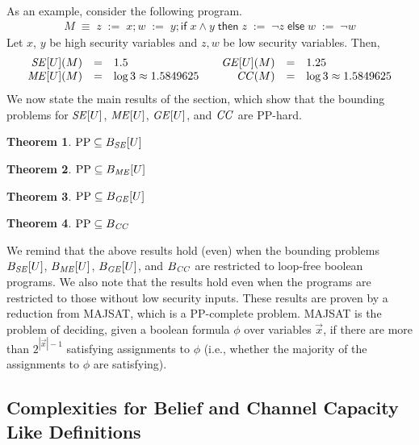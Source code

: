 \documentclass{llncs}
\newtheorem{theorem}{Theorem}[section]
\newcommand{\ttif}[3]{\textsf{if}\;{#1}\;\textsf{then}\;{#2}\;\textsf{else}\;{#3}}
\newcommand{\ttassign}[2]{{#1}\;:=\;{#2}}
\newcommand{\vect}[1]{\overrightarrow{{#1}}}
\begin{document}
As an example, consider the following program.
\[
\begin{array}{c}
M \;\equiv\; \ttassign{z}{x};\ttassign{w}{y};\ttif{x \wedge y}{\ttassign{z}{\neg z}}{\ttassign{w}{\neg w}}
\end{array}
\]
Let $x$, $y$ be high security variables and $z, w$ be low security
variables.  Then,
\[
\begin{array}{rcll}
{\it SE}[U](M) & = & 1.5\\
{\it ME}[U](M) & = & \log 3 \approx 1.5849625\\
\end{array}
\hspace{1em}
\begin{array}{rcll}
{\it GE}[U](M)&=& 1.25 \\
{\it CC}(M) & = & \log 3\approx 1.5849625 
\end{array}
\]
We now state the main results of the section, which show that the
bounding problems for ${\it SE}[U]$, ${\it ME}[U]$, ${\it GE}[U]$, and
${\it CC}$ are PP-hard.
\begin{theorem}
$\text{PP}\subseteq B_{\it SE}[U]$
\label{thm:ppse}
\end{theorem}
\begin{theorem}
$\text{PP}\subseteq B_{\it ME}[U]$
\label{thm:ppme}
\end{theorem}
\begin{theorem}
$\text{PP}\subseteq B_{\it GE}[U]$
\label{thm:ppge}
\end{theorem}
\begin{theorem}
$\text{PP}\subseteq B_{\it CC}$
\label{thm:ppcc}
\end{theorem}

We remind that the above results hold (even) when the bounding
problems $B_{\it SE}[U]$, $B_{\it ME}[U]$, $B_{\it GE}[U]$, and
$B_{\it CC}$ are restricted to loop-free boolean programs.  We also
note that the results hold even when the programs are restricted to
those without low security inputs.  These results are proven by a
reduction from MAJSAT, which is a PP-complete problem.  MAJSAT is the
problem of deciding, given a boolean formula $\phi$ over variables
$\vect x$, if there are more than $2^{|\vect x|-1}$ satisfying
assignments to $\phi$ (i.e., whether the majority of the assignments
to $\phi$ are satisfying).

\subsection{Complexities for Belief and Channel Capacity Like Definitions}
\end{document}
